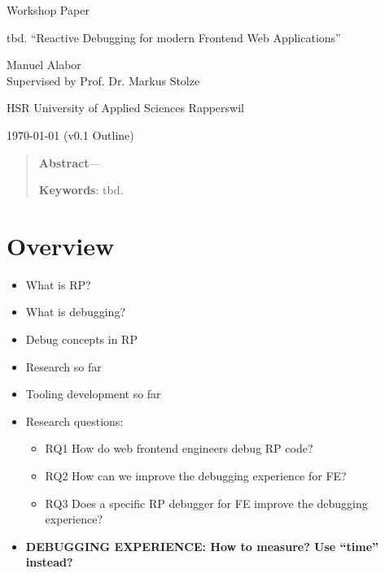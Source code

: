 \documentclass[12pt,a4paper]{article}
\newcommand{\version}{v0.1 Outline}
\begin{document}
\begin{centering}

	\Large{Workshop Paper}
	\par
	\Huge{tbd. ``Reactive Debugging for modern Frontend Web Applications''}
	\par
	\vspace{2ex}

	\normalsize{
		Manuel Alabor\\
		Supervised by Prof. Dr. Markus Stolze\\
		\par
		\vspace{2ex}
		HSR University of Applied Sciences Rapperswil\\
		\par
		\vspace{2ex}
		\today{} (\version)
	}
	\par
	\vspace{2ex}

	\begin{quotation}
		\small{
			\noindent\textbf{Abstract}---
		}
		\par
		\vspace{2ex}

		\small{
			\noindent\textbf{Keywords}: tbd.
		}
		\par
		\vspace{4ex}
	\end{quotation}
\end{centering}

\section{Overview}
\begin{itemize}
	\item What is RP?
	\item What is debugging?
	\item Debug concepts in RP
	\item Research so far
	\item Tooling development so far
	\item Research questions:
	\begin{itemize}
		\item RQ1 How do web frontend engineers debug RP code?
		\item RQ2 How can we improve the debugging experience for FE?
		\item RQ3 Does a specific RP debugger for FE improve the debugging experience?
	\end{itemize}
	\item \bf{DEBUGGING EXPERIENCE: How to measure? Use ``time'' instead?}
\end{itemize}
\end{document}
